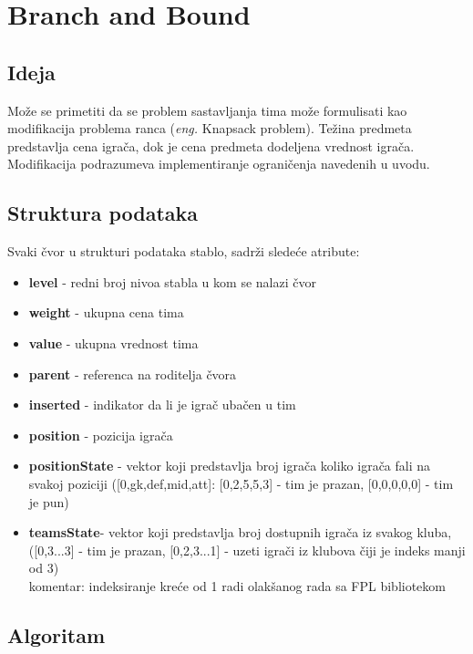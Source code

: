 \documentclass[a4paper]{article}
\newcommand{\eng}[1]{(\textit{eng.} #1)}
\begin{document}
\section{Branch and Bound}
\vspace{5mm} 
\subsection{Ideja}
\vspace{3mm} 
Može se primetiti da se problem sastavljanja tima može formulisati kao modifikacija problema ranca \eng{Knapsack problem}. Težina predmeta predstavlja cena igrača, dok je cena predmeta dodeljena vrednost igrača. Modifikacija podrazumeva implementiranje ograničenja navedenih u uvodu.

\subsection{Struktura podataka}
\vspace{3mm} 
Svaki čvor u strukturi podataka stablo, sadrži sledeće atribute: \\
\begin{itemize}
	\item \textbf{level} - redni broj nivoa stabla u kom se nalazi čvor
	\item \textbf{weight} - ukupna cena tima
	\item \textbf{value} - ukupna vrednost tima
	\item \textbf{parent} - referenca na roditelja čvora
	\item \textbf{inserted} - indikator da li je igrač ubačen u tim
	\item \textbf{position} - pozicija igrača
	\item \textbf{positionState} - vektor koji predstavlja broj igrača koliko igrača fali na svakoj poziciji ([0,gk,def,mid,att]: [0,2,5,5,3] - tim je prazan, [0,0,0,0,0] - tim je pun)
	\item \textbf{teamsState}-  vektor koji predstavlja broj dostupnih igrača iz svakog kluba, ([0,3...3] - tim je prazan, [0,2,3...1] - uzeti igrači iz klubova čiji je indeks manji od 3) \\
	
	komentar: indeksiranje kreće od 1 radi olakšanog rada sa FPL bibliotekom

\end{itemize}

\subsection{Algoritam}
\vspace{3mm} 
\end{document}
